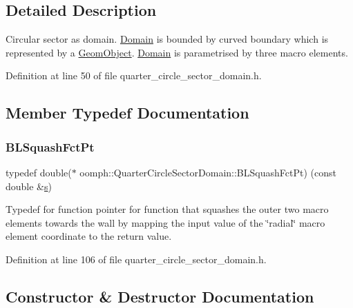 \subsection{Detailed Description}
Circular sector as domain. \hyperlink{classoomph_1_1Domain}{Domain} is bounded by curved boundary which is represented by a \hyperlink{classoomph_1_1GeomObject}{Geom\+Object}. \hyperlink{classoomph_1_1Domain}{Domain} is parametrised by three macro elements. 

Definition at line 50 of file quarter\+\_\+circle\+\_\+sector\+\_\+domain.\+h.



\subsection{Member Typedef Documentation}
\mbox{\label{classoomph_1_1QuarterCircleSectorDomain_a6cffab57f87c9f4ab01744647240bb1e}} 
\subsubsection{\texorpdfstring{B\+L\+Squash\+Fct\+Pt}{BLSquashFctPt}}
{\footnotesize\ttfamily typedef double($\ast$ oomph\+::\+Quarter\+Circle\+Sector\+Domain\+::\+B\+L\+Squash\+Fct\+Pt) (const double \&\hyperlink{cfortran_8h_ab7123126e4885ef647dd9c6e3807a21c}{s})}



Typedef for function pointer for function that squashes the outer two macro elements towards the wall by mapping the input value of the \char`\"{}radial\char`\"{} macro element coordinate to the return value. 



Definition at line 106 of file quarter\+\_\+circle\+\_\+sector\+\_\+domain.\+h.



\subsection{Constructor \& Destructor Documentation}
\mbox{\label{classoomph_1_1QuarterCircleSectorDomain_accee19bdd94e0e3fe0d7c347ede685de}} 

